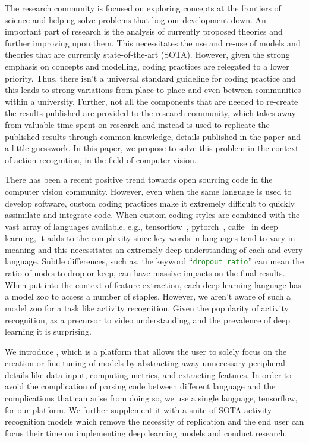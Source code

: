 \documentclass{llncs}
\begin{document}
The research community is focused on exploring concepts at the frontiers of science and helping solve problems that bog our development down.
An important part of research is the analysis of currently proposed theories and further improving upon them. 
This necessitates the use and re-use of models and theories that are currently state-of-the-art (SOTA). 
However, given the strong emphasis on concepts and modelling, coding practices are relegated to a lower priority.
Thus, there isn't a universal standard guideline for coding practice and this leads to strong variations from place to place and even between communities within a university.
Further, not all the components that are needed to re-create the results published are provided to the research community, which takes away from valuable time spent on research and instead is used to replicate the published results through common knowledge, details published in the paper and a little guesswork.
In this paper, we propose to solve this problem in the context of action recognition, in the field of computer vision.

There has been a recent positive trend towards open sourcing code in the computer vision community.
However, even when the same language is used to develop software, custom coding practices make it extremely difficult to quickly assimilate and integrate code.
When custom coding styles are combined with the vast array of languages available, e.g., tensorflow~\cite{abadi2016tensorflow}, pytorch~\cite{hdfszke2017automatic}, caffe~\cite{ijia2014caffe} in deep learning, it adds to the complexity since key words in languages tend to vary in meaning and this necessitates an extremely deep understanding of each and every language.
Subtle differences, such as, the keyword ``\texttt{\textcolor{ForestGreen}{dropout ratio}}'' can mean the ratio of nodes to drop or keep, can have massive impacts on the final results.
When put into the context of feature extraction, each deep learning language has a model zoo to access a number of staples. However, we aren't aware of such a model zoo for a task like activity recognition. 
Given the popularity of activity recognition, as a precursor to video understanding, and the prevalence of deep learning it is surprising.

We introduce \acro, which is a platform that allows the user to solely focus on the creation or fine-tuning of models by abstracting away unnecessary peripheral details like data input, computing metrics, and extracting features.
In order to avoid the complication of parsing code between different language and the complications that can arise from doing so, we use a single language, tensorflow, for our platform.
We further supplement it with a suite of SOTA activity recognition models which remove the necessity of replication and the end user can focus their time on implementing deep learning models and conduct research.
\end{document}
